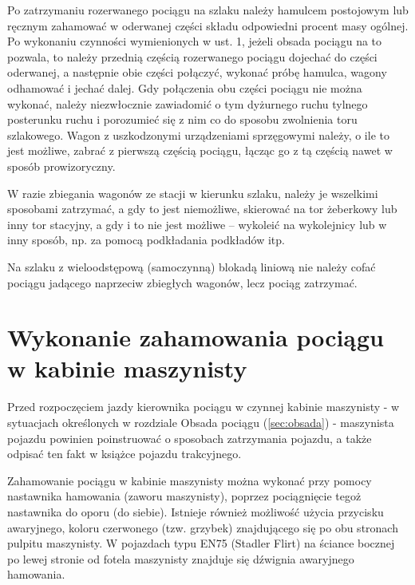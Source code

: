 Po zatrzymaniu rozerwanego pociągu na szlaku należy hamulcem postojowym lub ręcznym zahamować w oderwanej części składu odpowiedni procent masy ogólnej. Po wykonaniu czynności wymienionych w ust. 1, jeżeli obsada pociągu na to pozwala, to należy przednią częścią rozerwanego pociągu dojechać do części oderwanej, a następnie obie części połączyć, wykonać próbę hamulca, wagony odhamować i jechać dalej. Gdy połączenia obu części pociągu nie można wykonać, należy niezwłocznie zawiadomić o tym dyżurnego ruchu tylnego posterunku ruchu i porozumieć się z nim co do sposobu zwolnienia toru szlakowego. Wagon z uszkodzonymi urządzeniami sprzęgowymi należy, o ile to jest możliwe, zabrać z pierwszą częścią pociągu, łącząc go z tą częścią nawet w sposób prowizoryczny.

W razie zbiegania wagonów ze stacji w kierunku szlaku, należy je wszelkimi sposobami zatrzymać, a gdy to jest niemożliwe, skierować na tor żeberkowy lub inny tor stacyjny, a gdy i to nie jest możliwe – wykoleić na wykolejnicy lub w inny sposób, np. za pomocą podkładania podkładów itp. 

Na szlaku z wieloodstępową (samoczynną) blokadą liniową nie należy cofać pociągu jadącego naprzeciw zbiegłych wagonów, lecz pociąg zatrzymać.

\chapter{Wykonanie zahamowania pociągu w kabinie maszynisty}

Przed rozpoczęciem jazdy kierownika pociągu w czynnej kabinie maszynisty - w sytuacjach określonych w rozdziale Obsada pociągu (\ref{sec:obsada}) - maszynista pojazdu powinien poinstruować o sposobach zatrzymania pojazdu, a także odpisać ten fakt w książce pojazdu trakcyjnego.

Zahamowanie pociągu w kabinie maszynisty można wykonać przy pomocy nastawnika hamowania (zaworu maszynisty), poprzez pociągnięcie tegoż nastawnika do oporu (do siebie). Istnieje również możliwość użycia przycisku awaryjnego, koloru czerwonego (tzw. grzybek) znajdującego się po obu stronach pulpitu maszynisty. W pojazdach typu EN75 (Stadler Flirt) na ściance bocznej po lewej stronie od fotela maszynisty znajduje się dźwignia awaryjnego hamowania. 

